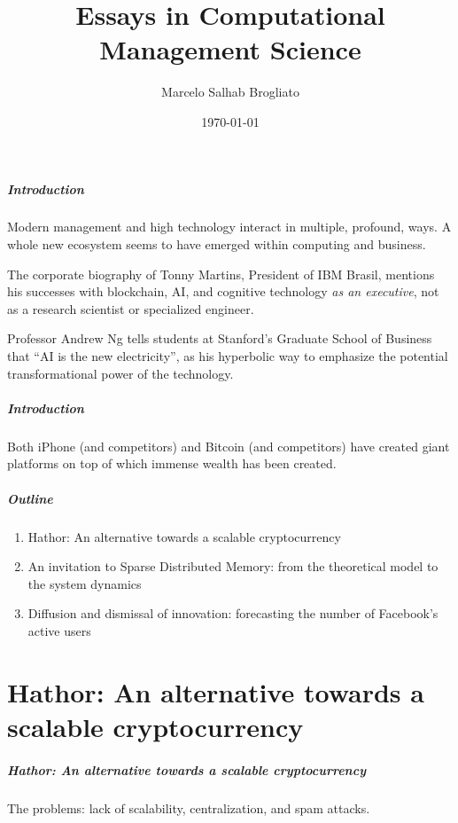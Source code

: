 \documentclass{beamer}
\title{Essays in Computational Management Science}
\author{Marcelo Salhab Brogliato}
\institute{EBAPE / FGV}
\date{\today}
\begin{document}
\begin{frame}
\titlepage
\end{frame}


\begin{frame}
\frametitle{Introduction}

Modern management and high technology interact in multiple, profound, ways. A whole new ecosystem seems to have emerged within computing and business.

The corporate biography of Tonny Martins, President of IBM Brasil, mentions his successes with blockchain, AI, and cognitive technology \emph{as an executive}, not as a research scientist or specialized engineer.

Professor Andrew Ng tells students at Stanford's Graduate School of Business that ``AI is the new electricity'', as his hyperbolic way to emphasize the potential transformational power of the technology.
\end{frame}

\begin{frame}
\frametitle{Introduction}

Both iPhone (and competitors) and Bitcoin (and competitors) have created giant platforms on top of which immense wealth has been created.

\end{frame}


\begin{frame}
\frametitle{Outline}
\begin{enumerate}[I]
\item Hathor: An alternative towards a scalable cryptocurrency
\item An invitation to Sparse Distributed Memory: from the theoretical model to the system dynamics
\item Diffusion and dismissal of innovation: forecasting the number of Facebook’s active users
\end{enumerate}
\end{frame}


\part{Hathor: An alternative towards a scalable cryptocurrency}
\begin{frame}
\frametitle{Hathor: An alternative towards a scalable cryptocurrency}

The problems: lack of scalability, centralization, and spam attacks.



\end{frame}
\end{document}
